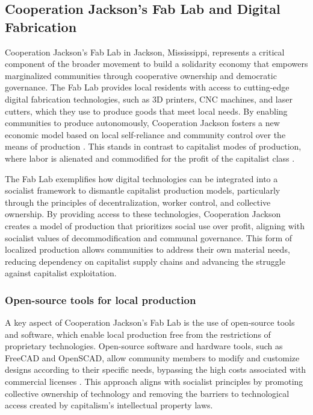 \begin{refsection}
\subsection{Cooperation Jackson's Fab Lab and Digital Fabrication}

Cooperation Jackson’s Fab Lab in Jackson, Mississippi, represents a critical component of the broader movement to build a solidarity economy that empowers marginalized communities through cooperative ownership and democratic governance. The Fab Lab provides local residents with access to cutting-edge digital fabrication technologies, such as 3D printers, CNC machines, and laser cutters, which they use to produce goods that meet local needs. By enabling communities to produce autonomously, Cooperation Jackson fosters a new economic model based on local self-reliance and community control over the means of production \cite[pp.~25-40]{jackson2019}. This stands in contrast to capitalist modes of production, where labor is alienated and commodified for the profit of the capitalist class \cite[pp.~45-67]{marx2018}.

The Fab Lab exemplifies how digital technologies can be integrated into a socialist framework to dismantle capitalist production models, particularly through the principles of decentralization, worker control, and collective ownership. By providing access to these technologies, Cooperation Jackson creates a model of production that prioritizes social use over profit, aligning with socialist values of decommodification and communal governance. This form of localized production allows communities to address their own material needs, reducing dependency on capitalist supply chains and advancing the struggle against capitalist exploitation.

\subsubsection{Open-source tools for local production}

A key aspect of Cooperation Jackson's Fab Lab is the use of open-source tools and software, which enable local production free from the restrictions of proprietary technologies. Open-source software and hardware tools, such as FreeCAD and OpenSCAD, allow community members to modify and customize designs according to their specific needs, bypassing the high costs associated with commercial licenses \cite[pp.~89-102]{stallman2010}. This approach aligns with socialist principles by promoting collective ownership of technology and removing the barriers to technological access created by capitalism’s intellectual property laws.


\end{refsection}
